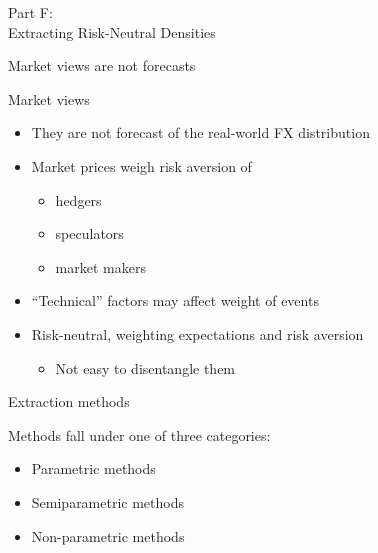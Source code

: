 \documentclass[ignorenonframetext,aspectratio=169]{beamer}
\providecommand{\tightlist}{%
  \setlength{\itemsep}{0pt}\setlength{\parskip}{0pt}}
\begin{document}
\begin{frame}{}

\color{blue} \LARGE{Part F:}\\
\LARGE{Extracting Risk-Neutral Densities}

\end{frame}

\begin{frame}{Market views are not forecasts}

Market views

\begin{itemize}
\tightlist
\item
  They are not forecast of the real-world FX distribution
\item
  Market prices weigh risk aversion of

  \begin{itemize}
  \tightlist
  \item
    hedgers
  \item
    speculators
  \item
    market makers
  \end{itemize}
\item
  ``Technical'' factors may affect weight of events
\item
  Risk-neutral, weighting expectations and risk aversion

  \begin{itemize}
  \tightlist
  \item
    Not easy to disentangle them
  \end{itemize}
\end{itemize}

\end{frame}

\begin{frame}{Extraction methods}

Methods fall under one of three categories:

\begin{itemize}
\tightlist
\item
  Parametric methods
\item
  Semiparametric methods
\item
  Non-parametric methods
\end{itemize}

\end{frame}
\end{document}

